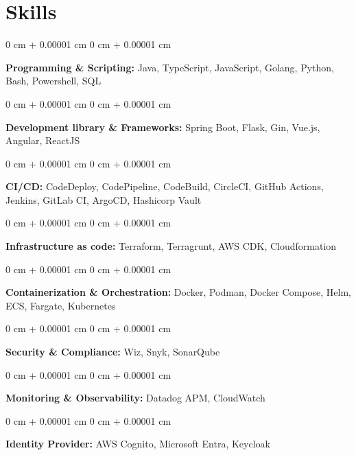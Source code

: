 \documentclass[11pt, letterpaper]{article}
\newenvironment{onecolentry}{
\begin{adjustwidth}{
0 cm + 0.00001 cm
}{
0 cm + 0.00001 cm
}
}{
\end{adjustwidth}
} %
\begin{document}
\section{Skills}

\begin{onecolentry}
\textbf{Programming \& Scripting:} Java,
TypeScript, JavaScript, Golang, Python, Bash, Powershell, SQL
\end{onecolentry}

\vspace{0.05 cm}
\begin{onecolentry}
\textbf{Development library \& Frameworks:} Spring Boot, Flask, Gin, Vue.js, Angular, ReactJS
\end{onecolentry}

\vspace{0.05 cm}
\begin{onecolentry}
\textbf{CI\//CD:} CodeDeploy, CodePipeline, CodeBuild, CircleCI, GitHub Actions, Jenkins, GitLab CI, ArgoCD, Hashicorp Vault \end{onecolentry}

\vspace{0.05 cm}
\begin{onecolentry}
\textbf{Infrastructure as code:} Terraform, Terragrunt, AWS CDK, Cloudformation \end{onecolentry}

\vspace{0.05 cm}
\begin{onecolentry}
\textbf{Containerization \& Orchestration:} Docker, Podman, Docker Compose, Helm,
ECS, Fargate, Kubernetes

\end{onecolentry}
\vspace{0.05 cm}

\begin{onecolentry}
\textbf{Security \& Compliance:} Wiz, Snyk, SonarQube


\end{onecolentry}

\vspace{0.05 cm}
\begin{onecolentry}
\textbf{Monitoring \& Observability:} Datadog APM, CloudWatch


\end{onecolentry}

\vspace{0.05 cm}
\begin{onecolentry}
\textbf{Identity Provider:} AWS Cognito, Microsoft Entra, Keycloak


\end{onecolentry}
\end{document}
